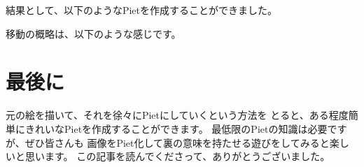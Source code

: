 結果として、以下のようなPietを作成することができました。


移動の概略は、以下のような感じです。


\section{最後に}

元の絵を描いて、それを徐々にPietにしていくという方法を
とると、ある程度簡単にきれいなPietを作成することができます。
最低限のPietの知識は必要ですが、ぜひ皆さんも
画像をPiet化して裏の意味を持たせる遊びをしてみると楽しいと思います。
この記事を読んでくださって、ありがとうございました。
